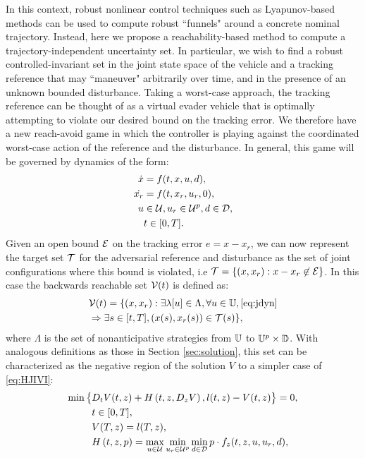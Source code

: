 In this context, robust nonlinear control techniques such as Lyapunov-based methods
\cite{Majumdar2013}%
can be used to compute robust ``funnels" around a concrete nominal trajectory.
Instead, here we propose a reachability-based method to compute a trajectory-independent uncertainty set. In particular, we wish to find a robust controlled-invariant set in the joint state space of the vehicle and a tracking reference that may ``maneuver" arbitrarily over time, and in the presence of an unknown bounded disturbance. Taking a worst-case approach, the tracking reference can be thought of as a virtual evader vehicle that is optimally attempting to violate our desired bound on the tracking error. We therefore have a new reach-avoid game in which the controller is playing against the coordinated worst-case action of the reference and the disturbance. In general, this game will be governed by dynamics of the form:
\begin{equation}
\label{eq:jdyn} %
\begin{aligned}
\dot{x} &= f(t, x, u, d), \\
\dot{x_r} &=f(t,x_r,u_r,0),\\
u &\in \cset, u_r\in\cset^p, d \in \dset, \\
&t \in [0, T].
\end{aligned}
\end{equation}
Given an open bound $\mathcal{E}$ on the tracking error $e=x-x_r$, we can now represent the target set $\mathcal{T}$ for the adversarial reference and disturbance as the set of joint configurations where this bound is violated, i.e $\mathcal{T} = \{(x,x_r): x-x_r\not\in\mathcal{E}\}$. In this case the backwards reachable set $\mathcal{V}(t)$ is defined as:
\begin{equation}
\label{eq:brs}
\begin{aligned}
&\mathcal{V}(t) = \{(x,x_r):  \exists \lambda[u] \in \Lambda, \forall u \in \mathbb{U}, \eqref{eq:jdyn} \\
&\Rightarrow \exists s \in [t, T], (x(s),x_r(s)) \in \mathcal{T}(s)\},
\end{aligned}
\end{equation}
where $\Lambda$ is the set of nonanticipative strategies from $\mathbb{U}$ to $\mathbb{U}^p\times \mathbb{D}$.
With analogous definitions as those in Section \ref{sec:solution}, this set can be characterized as the negative region of the solution $V$ to a simpler case of \eqref{eq:HJIVI}:
\begin{equation}
\label{eq:HJIVI_track}
\begin{aligned}
\min\big\{&D_t V(t, z) + H\left(t, z, D_z V\right), l(t,z) - V(t, z)\big\}= 0,\\&  t\in[0,T],\\
&V(T, z) = l(T, z),\\
&H\left(t, z, p\right) = \max_{u \in \mathcal{U}} \min_{u_r \in\mathcal{U}^p} \min_{d \in \mathcal{D}} p \cdot f_z(t,z,u,u_r,d),
\end{aligned}
\end{equation}

